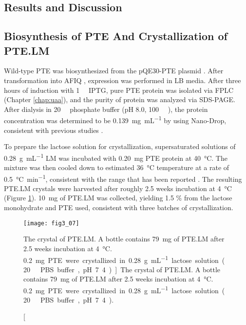 \begin{refsection}
\section{Results and Discussion}

\subsection{Biosynthesis of PTE And Crystallization of PTE.LM}

Wild-type PTE was biosynthesized from the pQE30-PTE plasmid \cite{Yang2014a}.
After transformation into AFIQ  \cite{Baker2011b}, expression
was performed in LB media. After three hours of induction with
\SI{1}{\milli\Molar} IPTG, pure PTE protein was isolated via FPLC (Chapter
\ref{chap:uaa}), and the purity of protein was analyzed via SDS-PAGE. After
dialysis in \SI{20}{\milli\Molar} phosphate buffer (pH 8.0,
\SI{100}{\micro\Molar} ), the protein concentration was determined to
be \SI{0.139}{\mg\per\mL} by using Nano-Drop, consistent with previous studies
\cite{Yang2014a}.

To prepare the lactose solution for crystallization, supersaturated solutions
of \SI{0.28}{\gram\per\mL} LM was incubated with \SI{0.20}{\milli\gram} PTE
protein at \SI{40}{\celsius}. The mixture was then cooled down to estimated
\SI{36}{\celsius} temperature at a rate of \SI{0.5}{\celsius\per\minute},
consistent with the range that has been reported \cite{Valle-Vega1977}. The
resulting PTE.LM crystals were harvested after roughly 2.5 weeks incubation at
\SI{4}{\celsius} (Figure \ref{fig:ptelm-bottle}). \SI{10}{\milli\gram} of
PTE.LM was collected, yielding 1.5 \% from the lactose monohydrate and PTE
used, consistent with three batches of crystallization. 
\begin{figure}[htbp] \centering \texttt{[image: fig3\_07]}
    \caption[The crystal of PTE.LM. A bottle contains
        \SI{79}{\mg} of PTE.LM after 2.5 weeks incubation at \SI{4}{\celsius}.
        \SI{0.2}mg PTE were crystallized in \SI{0.28}{\gram\per\mL} lactose
        solution (\SI{20}{\milli\Molar} PBS buffer, pH 7.4).]{The
            crystal of PTE.LM. A bottle contains \SI{79}{\mg} of PTE.LM
            after 2.5 weeks incubation at \SI{4}{\celsius}.  \SI{0.2}mg PTE
            were crystallized in \SI{0.28}{\gram\per\mL} lactose solution
            (\SI{20}{\milli\Molar} PBS buffer, pH 7.4).}
        \label{fig:ptelm-bottle} 
\end{figure}


\end{refsection}
